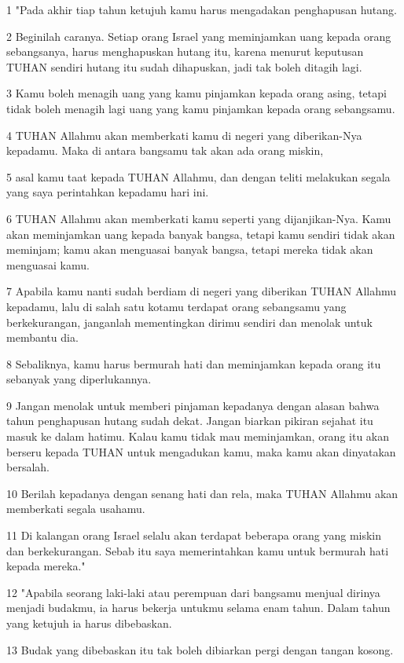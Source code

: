 \par 1 "Pada akhir tiap tahun ketujuh kamu harus mengadakan penghapusan hutang.
\par 2 Beginilah caranya. Setiap orang Israel yang meminjamkan uang kepada orang sebangsanya, harus menghapuskan hutang itu, karena menurut keputusan TUHAN sendiri hutang itu sudah dihapuskan, jadi tak boleh ditagih lagi.
\par 3 Kamu boleh menagih uang yang kamu pinjamkan kepada orang asing, tetapi tidak boleh menagih lagi uang yang kamu pinjamkan kepada orang sebangsamu.
\par 4 TUHAN Allahmu akan memberkati kamu di negeri yang diberikan-Nya kepadamu. Maka di antara bangsamu tak akan ada orang miskin,
\par 5 asal kamu taat kepada TUHAN Allahmu, dan dengan teliti melakukan segala yang saya perintahkan kepadamu hari ini.
\par 6 TUHAN Allahmu akan memberkati kamu seperti yang dijanjikan-Nya. Kamu akan meminjamkan uang kepada banyak bangsa, tetapi kamu sendiri tidak akan meminjam; kamu akan menguasai banyak bangsa, tetapi mereka tidak akan menguasai kamu.
\par 7 Apabila kamu nanti sudah berdiam di negeri yang diberikan TUHAN Allahmu kepadamu, lalu di salah satu kotamu terdapat orang sebangsamu yang berkekurangan, janganlah mementingkan dirimu sendiri dan menolak untuk membantu dia.
\par 8 Sebaliknya, kamu harus bermurah hati dan meminjamkan kepada orang itu sebanyak yang diperlukannya.
\par 9 Jangan menolak untuk memberi pinjaman kepadanya dengan alasan bahwa tahun penghapusan hutang sudah dekat. Jangan biarkan pikiran sejahat itu masuk ke dalam hatimu. Kalau kamu tidak mau meminjamkan, orang itu akan berseru kepada TUHAN untuk mengadukan kamu, maka kamu akan dinyatakan bersalah.
\par 10 Berilah kepadanya dengan senang hati dan rela, maka TUHAN Allahmu akan memberkati segala usahamu.
\par 11 Di kalangan orang Israel selalu akan terdapat beberapa orang yang miskin dan berkekurangan. Sebab itu saya memerintahkan kamu untuk bermurah hati kepada mereka."
\par 12 "Apabila seorang laki-laki atau perempuan dari bangsamu menjual dirinya menjadi budakmu, ia harus bekerja untukmu selama enam tahun. Dalam tahun yang ketujuh ia harus dibebaskan.
\par 13 Budak yang dibebaskan itu tak boleh dibiarkan pergi dengan tangan kosong.
